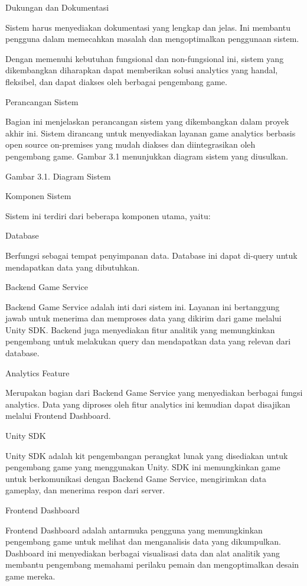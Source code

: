 Dukungan dan Dokumentasi

Sistem harus menyediakan dokumentasi yang lengkap dan jelas. Ini membantu pengguna dalam memecahkan masalah dan mengoptimalkan penggunaan sistem.

Dengan memenuhi kebutuhan fungsional dan non-fungsional ini, sistem yang dikembangkan diharapkan dapat memberikan solusi analytics yang handal, fleksibel, dan dapat diakses oleh berbagai pengembang game.

Perancangan Sistem

Bagian ini menjelaskan perancangan sistem yang dikembangkan dalam proyek akhir ini. Sistem dirancang untuk menyediakan layanan game analytics berbasis open source on-premises yang mudah diakses dan diintegrasikan oleh pengembang game. Gambar 3.1 menunjukkan diagram sistem yang diusulkan.

Gambar 3.1. Diagram Sistem

Komponen Sistem

Sistem ini terdiri dari beberapa komponen utama, yaitu:

Database

Berfungsi sebagai tempat penyimpanan data. Database ini dapat di-query untuk mendapatkan data yang dibutuhkan.

Backend Game Service

Backend Game Service adalah inti dari sistem ini. Layanan ini bertanggung jawab untuk menerima dan memproses data yang dikirim dari game melalui Unity SDK. Backend juga menyediakan fitur analitik yang memungkinkan pengembang untuk melakukan query dan mendapatkan data yang relevan dari database.

Analytics Feature

Merupakan bagian dari Backend Game Service yang menyediakan berbagai fungsi analytics. Data yang diproses oleh fitur analytics ini kemudian dapat disajikan melalui Frontend Dashboard.

Unity SDK

Unity SDK adalah kit pengembangan perangkat lunak yang disediakan untuk pengembang game yang menggunakan Unity. SDK ini memungkinkan game untuk berkomunikasi dengan Backend Game Service, mengirimkan data gameplay, dan menerima respon dari server.

Frontend Dashboard

Frontend Dashboard adalah antarmuka pengguna yang memungkinkan pengembang game untuk melihat dan menganalisis data yang dikumpulkan. Dashboard ini menyediakan berbagai visualisasi data dan alat analitik yang membantu pengembang memahami perilaku pemain dan mengoptimalkan desain game mereka.

